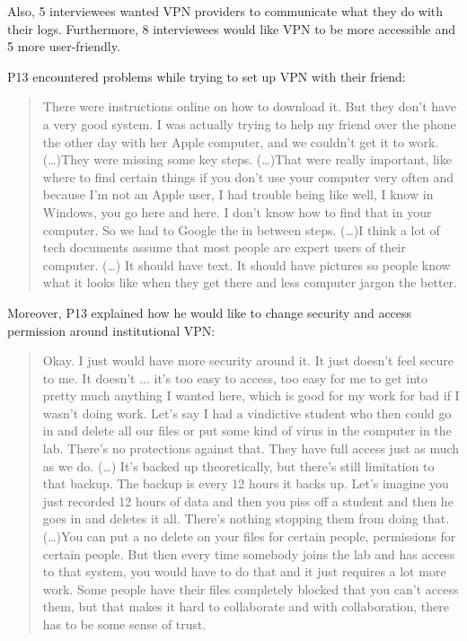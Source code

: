 Also, 5 interviewees wanted VPN providers to communicate what they do with
their logs. Furthermore, 8 interviewees would like VPN to be more accessible
and 5 more user-friendly. 

P13 encountered problems while trying to set up VPN with their friend:
\begin{quote}There were instructions online on how to download it. But they
don't have a very good system. I was actually trying to help my friend over
the phone the other day with her Apple computer, and we couldn't get it to
work. (\dots)They were missing some key steps. (\dots)That were really
important, like where to find certain things if you don't use your computer
very often and because I'm not an Apple user, I had trouble being like well, I
know in Windows, you go here and here. I don't know how to find that in your
computer. So we had to Google the in between steps. (\dots)I think a lot of
tech documents assume that most people are expert users of their computer.
(\dots) It should have text. It should have pictures so people know what it
looks like when they get there and less computer jargon the better.\end{quote}

Moreover, P13 explained how he would like to change security and access
permission around institutional VPN: \begin{quote}Okay. I just would have more
    security around it. It just doesn't feel secure to me. It doesn't ... it's
    too easy to access, too easy for me to get into pretty much anything I
    wanted here, which is good for my work for bad if I wasn't doing work.
    Let's say I had a vindictive student who then could go in and delete all
    our files or put some kind of virus in the computer in the lab. There's no
    protections against that. They have full access just as much as we do. (…)
    It's backed up theoretically, but there's still limitation to that backup.
    The backup is every 12 hours it backs up. Let's imagine you just recorded
    12 hours of data and then you piss off a student and then he goes in and
    deletes it all. There's nothing stopping them from doing that.  (\dots)You
can put a no delete on your files for certain people, permissions for certain
people. But then every time somebody joins the lab and has access to that
system, you would have to do that and it just requires a lot more work. Some
people have their files completely blocked that you can't access them, but
that makes it hard to collaborate and with collaboration, there has to be some
sense of trust.\end{quote}



